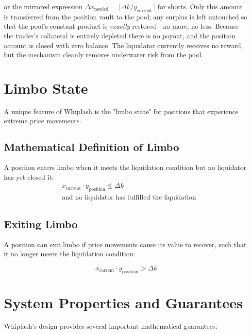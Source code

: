 \documentclass[11pt]{article}
\begin{document}
or the mirrored expression $\Delta x_{\text{needed}} = \lceil \Delta k / y_{\text{current}} \rceil$ for shorts. Only this amount is transferred from the position vault to the pool; any surplus is left untouched so that the pool's constant product is \emph{exactly} restored—no more, no less. Because the trader's collateral is entirely depleted there is no payout, and the position account is closed with zero balance. The liquidator currently receives no reward, but the mechanism cleanly removes underwater risk from the pool.

\section{Limbo State}

A unique feature of Whiplash is the "limbo state" for positions that experience extreme price movements.

\subsection{Mathematical Definition of Limbo}

A position enters limbo when it meets the liquidation condition but no liquidator has yet closed it:
\begin{equation}
\begin{aligned}
&x_{\text{current}} \cdot y_{\text{position}} \le \Delta k \\
&\text{and no liquidator has fulfilled the liquidation}
\end{aligned}
\end{equation}

\subsection{Exiting Limbo}

A position can exit limbo if price movements cause its value to recover, such that it no longer meets the liquidation condition:

\begin{equation}
x_{\text{current}} \cdot y_{\text{position}} > \Delta k
\end{equation}

\section{System Properties and Guarantees}

Whiplash's design provides several important mathematical guarantees:
\end{document}
